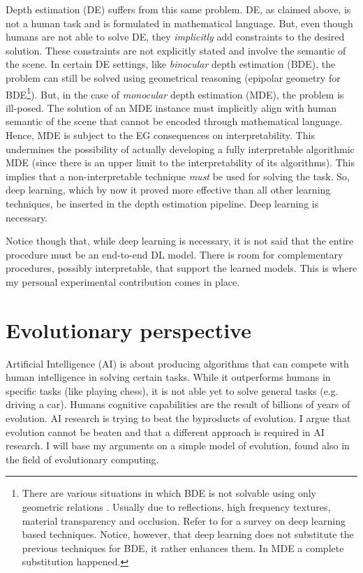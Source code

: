 Depth estimation (DE) suffers from this same problem.
DE, as claimed above, is not a human task and is formulated in mathematical language.
But, even though humans are not able to solve DE, they \textit{implicitly} add constraints to the desired solution.
These constraints are not explicitly stated and involve the semantic of the scene.
In certain DE settings, like \textit{binocular} depth estimation (BDE), the problem can still be solved using geometrical reasoning (epipolar geometry \cite{multiview} for BDE\footnote{
    There are various situations in which BDE is not solvable using only geometric relations \cite{correspondence}.
    Usually due to reflections, high frequency textures, material transparency and occlusion.
    Refer to \cite{stereo} for a survey on deep learning based techniques.
    Notice, however, that deep learning does not substitute the previous techniques for BDE, it rather enhances them.
    In MDE a complete substitution happened.
}).
But, in the case of \textit{monocular} depth estimation (MDE), the problem is ill-posed.
The solution of an MDE instance must implicitly align with human semantic of the scene that cannot be encoded through mathematical language.
Hence, MDE is subject to the EG consequences on interpretability.
This undermines the possibility of actually developing a fully interpretable algorithmic MDE (since there is an upper limit to the interpretability of its algorithms).
This implies that a non-interpretable technique \textit{must} be used for solving the task.
So, deep learning, which by now it proved more effective than all other learning techniques,  be inserted in the depth estimation pipeline.
Deep learning is necessary.

Notice though that, while deep learning is necessary, it is not said that the entire procedure must be an end-to-end DL model.
There is room for complementary procedures, possibly interpretable, that support the learned models.
This is where my personal experimental contribution comes in place.

\section{Evolutionary perspective}
Artificial Intelligence (AI) is about producing algorithms that can compete with human intelligence in solving certain tasks.
While it outperforms humans in specific tasks (like playing chess), it is not able yet to solve general tasks (e.g. driving a car).
Humans cognitive capabilities are the result of billions of years of evolution.
AI research is trying to beat the byproducts of evolution.
I argue that evolution cannot be beaten and that a different approach is required in AI research.
I will base my arguments on a simple model of evolution, found also in the field of evolutionary computing.

